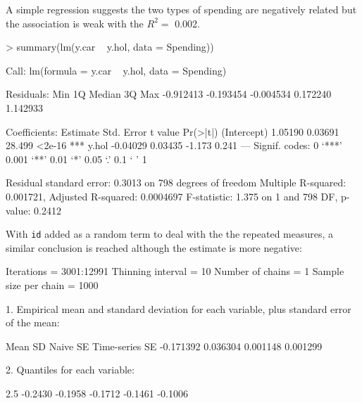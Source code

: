 \documentclass{article}
\begin{document}
A simple regression suggests the two types of spending are negatively related but the association is weak with the $R^{2}=$ 0.002.

\begin{Schunk}
\begin{Sinput}
> summary(lm(y.car ~ y.hol, data = Spending))
\end{Sinput}
\begin{Soutput}
Call:
lm(formula = y.car ~ y.hol, data = Spending)

Residuals:
      Min        1Q    Median        3Q       Max 
-0.912413 -0.193454 -0.004534  0.172240  1.142933 

Coefficients:
            Estimate Std. Error t value Pr(>|t|)    
(Intercept)  1.05190    0.03691  28.499   <2e-16 ***
y.hol       -0.04029    0.03435  -1.173    0.241    
---
Signif. codes:  0 ‘***’ 0.001 ‘**’ 0.01 ‘*’ 0.05 ‘.’ 0.1 ‘ ’ 1 

Residual standard error: 0.3013 on 798 degrees of freedom
Multiple R-squared: 0.001721,	Adjusted R-squared: 0.0004697 
F-statistic: 1.375 on 1 and 798 DF,  p-value: 0.2412 
\end{Soutput}
\end{Schunk}

With \texttt{id} added as a random term to deal with the the repeated measures, a similar conclusion is reached although the estimate is more negative:

\iftalk
\else
\fi

\begin{Schunk}
\begin{Soutput}
Iterations = 3001:12991
Thinning interval = 10 
Number of chains = 1 
Sample size per chain = 1000 

1. Empirical mean and standard deviation for each variable,
   plus standard error of the mean:

          Mean             SD       Naive SE Time-series SE 
     -0.171392       0.036304       0.001148       0.001299 

2. Quantiles for each variable:

   2.5%
-0.2430 -0.1958 -0.1712 -0.1461 -0.1006 
\end{Soutput}
\end{Schunk}
\end{document}
